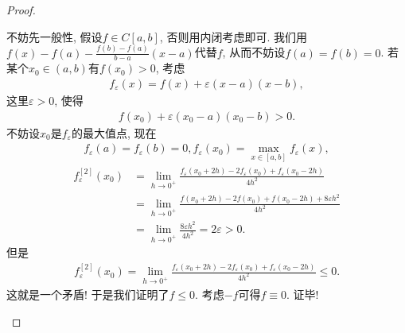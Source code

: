 \documentclass[../../main.tex]{subfiles}%
\begin{document}
\begin{proof}
\begin{enumerate}
不妨先一般性, 假设$f \in C[a,b]$, 否则用内闭考虑即可. 
我们用$f(x) - f(a) - \frac{f(b) - f(a)}{b - a}(x - a)$代替$f$, 从而不妨设$f(a) = f(b) = 0$. 若某个$x_0 \in (a,b)$有$f(x_0) > 0$, 考虑
\begin{align*}
f_\varepsilon(x) = f(x) + \varepsilon(x - a)(x - b),
\end{align*}
这里$\varepsilon > 0$, 使得
\begin{align*}
f(x_0) + \varepsilon(x_0 - a)(x_0 - b) > 0.
\end{align*}
不妨设$x_0$是$f_\varepsilon$的最大值点, 现在
\begin{gather*}
f_\varepsilon(a) = f_\varepsilon(b) = 0, f_\varepsilon(x_0) = \max_{x \in [a,b]} f_\varepsilon(x),
\end{gather*}
\begin{align*}
f_{\varepsilon}^{[2]}(x_0)&=\lim_{h\rightarrow 0^+} \frac{f_{\varepsilon}(x_0+2h)-2f_{\varepsilon}(x_0)+f_{\varepsilon}(x_0-2h)}{4h^2}
\\
&=\lim_{h\rightarrow 0^+} \frac{f(x_0+2h)-2f(x_0)+f(x_0-2h)+8\varepsilon h^2}{4h^2}
\\
&=\lim_{h\rightarrow 0^+} \frac{8\varepsilon h^2}{4h^2}=2\varepsilon >0.
\end{align*}
但是
\begin{align*}
f_\varepsilon^{[2]}(x_0) = \lim_{h \to 0^+} \frac{f_\varepsilon(x_0 + 2h) - 2f_\varepsilon(x_0) + f_\varepsilon(x_0 - 2h)}{4h^2} \leqslant 0.
\end{align*}
这就是一个矛盾! 于是我们证明了$f \leqslant 0$. 考虑$-f$可得$f \equiv 0$. 证毕!
\end{enumerate}
\end{proof}
\end{document}
